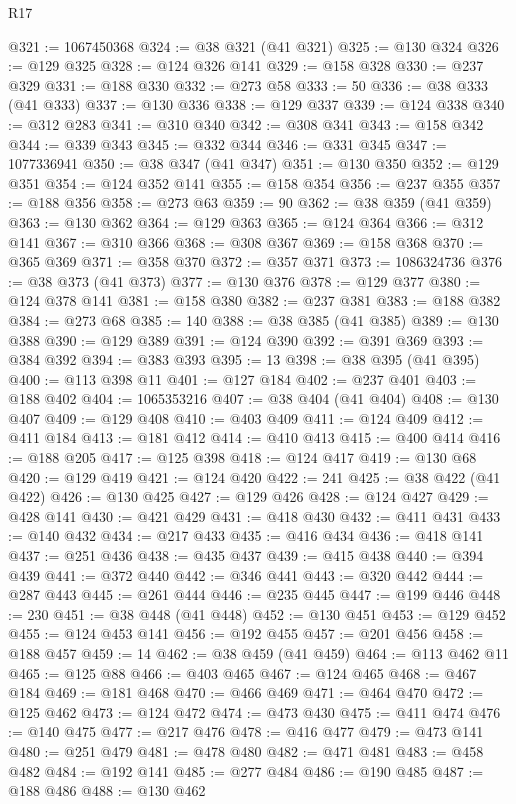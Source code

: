 \begin{lexlean}{R17}
\begin{coremodule}
@321 := 1067450368
@324 := @38 @321 (@41 @321)
@325 := @130 @324
@326 := @129 @325
@328 := @124 @326 @141
@329 := @158 @328
@330 := @237 @329
@331 := @188 @330
@332 := @273 @58
@333 := 50
@336 := @38 @333 (@41 @333)
@337 := @130 @336
@338 := @129 @337
@339 := @124 @338
@340 := @312 @283
@341 := @310 @340
@342 := @308 @341
@343 := @158 @342
@344 := @339 @343
@345 := @332 @344
@346 := @331 @345
@347 := 1077336941
@350 := @38 @347 (@41 @347)
@351 := @130 @350
@352 := @129 @351
@354 := @124 @352 @141
@355 := @158 @354
@356 := @237 @355
@357 := @188 @356
@358 := @273 @63
@359 := 90
@362 := @38 @359 (@41 @359)
@363 := @130 @362
@364 := @129 @363
@365 := @124 @364
@366 := @312 @141
@367 := @310 @366
@368 := @308 @367
@369 := @158 @368
@370 := @365 @369
@371 := @358 @370
@372 := @357 @371
@373 := 1086324736
@376 := @38 @373 (@41 @373)
@377 := @130 @376
@378 := @129 @377
@380 := @124 @378 @141
@381 := @158 @380
@382 := @237 @381
@383 := @188 @382
@384 := @273 @68
@385 := 140
@388 := @38 @385 (@41 @385)
@389 := @130 @388
@390 := @129 @389
@391 := @124 @390
@392 := @391 @369
@393 := @384 @392
@394 := @383 @393
@395 := 13
@398 := @38 @395 (@41 @395)
@400 := @113 @398 @11
@401 := @127 @184
@402 := @237 @401
@403 := @188 @402
@404 := 1065353216
@407 := @38 @404 (@41 @404)
@408 := @130 @407
@409 := @129 @408
@410 := @403 @409
@411 := @124 @409
@412 := @411 @184
@413 := @181 @412
@414 := @410 @413
@415 := @400 @414
@416 := @188 @205
@417 := @125 @398
@418 := @124 @417
@419 := @130 @68
@420 := @129 @419
@421 := @124 @420
@422 := 241
@425 := @38 @422 (@41 @422)
@426 := @130 @425
@427 := @129 @426
@428 := @124 @427
@429 := @428 @141
@430 := @421 @429
@431 := @418 @430
@432 := @411 @431
@433 := @140 @432
@434 := @217 @433
@435 := @416 @434
@436 := @418 @141
@437 := @251 @436
@438 := @435 @437
@439 := @415 @438
@440 := @394 @439
@441 := @372 @440
@442 := @346 @441
@443 := @320 @442
@444 := @287 @443
@445 := @261 @444
@446 := @235 @445
@447 := @199 @446
@448 := 230
@451 := @38 @448 (@41 @448)
@452 := @130 @451
@453 := @129 @452
@455 := @124 @453 @141
@456 := @192 @455
@457 := @201 @456
@458 := @188 @457
@459 := 14
@462 := @38 @459 (@41 @459)
@464 := @113 @462 @11
@465 := @125 @88
@466 := @403 @465
@467 := @124 @465
@468 := @467 @184
@469 := @181 @468
@470 := @466 @469
@471 := @464 @470
@472 := @125 @462
@473 := @124 @472
@474 := @473 @430
@475 := @411 @474
@476 := @140 @475
@477 := @217 @476
@478 := @416 @477
@479 := @473 @141
@480 := @251 @479
@481 := @478 @480
@482 := @471 @481
@483 := @458 @482
@484 := @192 @141
@485 := @277 @484
@486 := @190 @485
@487 := @188 @486
@488 := @130 @462

\end{coremodule}
\end{lexlean}
